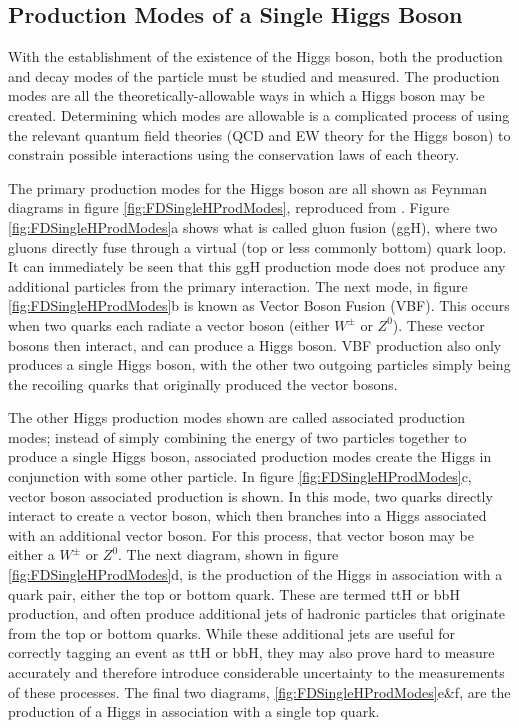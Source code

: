 \documentclass[12pt]{ucsddissertation}
\begin{document}
\subsection{Production Modes of a Single Higgs Boson}\label{sec:SingleHProdModes}
With the establishment of the existence of the Higgs boson, both the production and decay modes of the particle must be studied and measured. The production modes are all the theoretically-allowable ways in which a Higgs boson may be created. Determining which modes are allowable is a complicated process of using the relevant quantum field theories (QCD and EW theory for the Higgs boson) to constrain possible interactions using the conservation laws of each theory.

The primary production modes for the Higgs boson are all shown as Feynman diagrams in figure \ref{fig:FDSingleHProdModes}, reproduced from \cite{CMS10YearReview}. Figure \ref{fig:FDSingleHProdModes}a shows what is called gluon fusion (ggH), where two gluons directly fuse through a virtual (top or less commonly bottom) quark loop. It can immediately be seen that this ggH production mode does not produce any additional particles from the primary interaction. The next mode, in figure \ref{fig:FDSingleHProdModes}b is known as Vector Boson Fusion (VBF). This occurs when two quarks each radiate a vector boson (either $W^{\pm}$ or $Z^0$). These vector bosons then interact, and can produce a Higgs boson. VBF production also only produces a single Higgs boson, with the other two outgoing particles simply being the recoiling quarks that originally produced the vector bosons.

The other Higgs production modes shown are called associated production modes; instead of simply combining the energy of two particles together to produce a single Higgs boson, associated production modes create the Higgs in conjunction with some other particle. In figure \ref{fig:FDSingleHProdModes}c, vector boson associated production is shown. In this mode, two quarks directly interact to create a vector boson, which then branches into a Higgs associated with an additional vector boson. For this process, that vector boson may be either a $W^{\pm}$ or $Z^0$. The next diagram, shown in figure \ref{fig:FDSingleHProdModes}d, is the production of the Higgs in association with a quark pair, either the top or bottom quark. These are termed ttH or bbH production, and often produce additional jets of hadronic particles that originate from the top or bottom quarks. While these additional jets are useful for correctly tagging an event as ttH or bbH, they may also prove hard to measure accurately and therefore introduce considerable uncertainty to the measurements of these processes. The final two diagrams, \ref{fig:FDSingleHProdModes}e\&f, are the production of a Higgs in association with a single top quark. 
\end{document}
